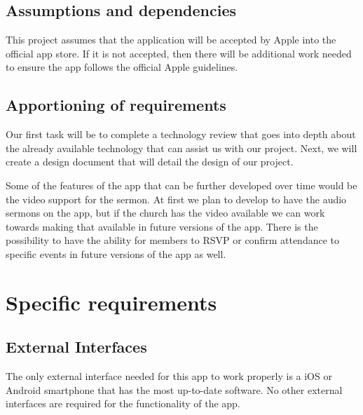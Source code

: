 \documentclass[letterpaper,10pt,draftclsnofoot,onecolumn,compsoc,titlepage]{IEEEtran}
\begin{document}
	\subsection{Assumptions and dependencies}
	This project assumes that the application will be accepted by Apple into the official app store.
	If it is not accepted, then there will be additional work needed to ensure the app follows the official Apple guidelines.

	\subsection{Apportioning of requirements}
	Our first task will be to complete a technology review that goes into depth about the already available technology that can assist us with our project. 
	Next, we will create a design document that will detail the design of our project. 
	
	Some of the features of the app that can be further developed over time would be the video support for the sermon. 
	At first we plan to develop to have the audio sermons on the app, but if the church has the video available we can work towards making that available in future versions of the app. 
	There is the possibility to have the ability for members to RSVP or confirm attendance to specific events in future versions of the app as well.
	

	\section{Specific requirements}
	\subsection{External Interfaces}
	The only external interface needed for this app to work properly is a iOS or Android smartphone that has the most up-to-date software.
	No other external interfaces are required for the functionality of the app.
\end{document}
